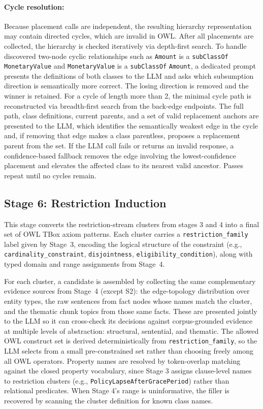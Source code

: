 \documentclass[sigconf]{acmart}
\begin{document}
\paragraph{\textbf{Cycle resolution:}} Because placement calls are independent, the resulting hierarchy representation may contain directed cycles, which are invalid in OWL. After all placements are collected, the hierarchy is checked iteratively via depth-first search. 
To handle discovered two-node cyclic relationships such as \texttt{Amount} is a \texttt{subClassOf} \texttt{MonetaryValue} and \texttt{MonetaryValue} is a \texttt{subClassOf} \texttt{Amount}, a dedicated prompt presents the definitions of both classes to the LLM and asks which subsumption direction is semantically more correct. The losing direction is removed and the winner is retained. For a cycle of length more than 2, the minimal cycle path is reconstructed via breadth-first search from the back-edge endpoints.
The full path, class definitions, current parents, and a set of valid replacement anchors are presented to the LLM, which identifies the semantically weakest edge in the cycle and, if removing that edge makes a class parentless,
proposes a replacement parent from the set.
If the LLM call fails or returns an invalid response, a confidence-based
fallback removes the edge involving the lowest-confidence placement and
elevates the affected class to its nearest valid ancestor. Passes repeat until no cycles remain.



\subsection*{Stage 6: Restriction Induction}
\label{subsec:stage6}

This stage converts the restriction-stream clusters from stages 3 and 4 into a final set of OWL TBox axiom patterns. Each cluster carries a \texttt{restriction\_family} label given by Stage~3, encoding the logical
structure of the constraint (e.g., \texttt{cardinality\_constraint},
\texttt{disjointness}, \texttt{eligibility\_condition}), along with typed domain and range assignments from Stage~4.

For each cluster, a candidate is assembled by collecting the same complementary evidence sources from Stage~4 (except S2): the edge-topology distribution over entity types, the raw sentences from fact nodes whose names match the cluster, and the thematic chunk topics from those same facts. These are presented jointly to the LLM so it can cross-check its decisions against corpus-grounded evidence at multiple levels of abstraction: structural, sentential, and thematic. The allowed OWL construct set is derived deterministically from \texttt{restriction\_family}, so the LLM selects from a small pre-constrained set rather than choosing freely among all OWL operators. 
Property names are resolved by token-overlap matching against the closed property vocabulary, since Stage 3 assigns clause-level names to restriction clusters (e.g., \texttt{PolicyLapseAfterGracePeriod}) rather than relational predicates. When Stage 4's range is uninformative, the filler is recovered by scanning the cluster definition for known class names.
\end{document}
